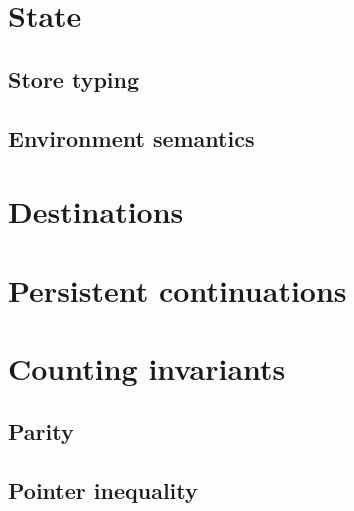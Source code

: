 \section{State}

\subsection{Store typing}


\subsection{Environment semantics}

\section{Destinations}
\label{sec:gen-destinations}


\section{Persistent continuations}
\label{sec:gen-letcc}

\section{Counting invariants}

\subsection{Parity}

\subsection{}

\subsection{Pointer inequality}
\label{sec:pointer-inequality}
